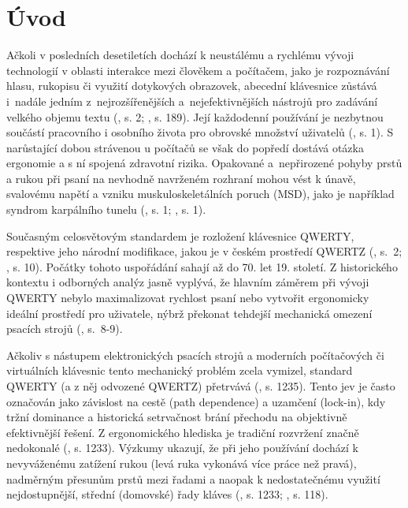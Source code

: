 \documentclass[a4paper, twoside, 12pt, czech]{article}
\begin{document}
\section{Úvod}
Ačkoli v posledních desetiletích dochází k neustálému a rychlému vývoji technologií 
v oblasti interakce mezi člověkem a počítačem, jako je rozpoznávání hlasu, rukopisu 
či využití dotykových obrazovek, abecední klávesnice zůstává i~nadále jedním 
z~nejrozšířenějších a~nejefektivnějších nástrojů pro zadávání velkého objemu textu
(\cite{applicationAlgo}, s. 2; \cite{textEntrySystems}, s. 189). 
Její každodenní používání je nezbytnou součástí pracovního i osobního života pro 
obrovské množství uživatelů (\cite{engramapproach}, s. 1). 
S narůstající dobou strávenou u počítačů se však do 
popředí dostává otázka ergonomie a s ní spojená zdravotní rizika. Opakované 
a~nepřirozené pohyby prstů a rukou při psaní na nevhodně navrženém rozhraní mohou 
vést k únavě, svalovému napětí a vzniku muskuloskeletálních poruch (MSD), jako 
je například syndrom karpálního tunelu (\cite{engramapproach}, s. 1; \cite{applicationAlgo}, s. 1).

Současným celosvětovým standardem je rozložení klávesnice QWERTY, 
respektive jeho národní modifikace, jakou je v českém prostředí QWERTZ (\cite{applicationAlgo}, s.~2; \cite{lockin}, s. 10). Počátky 
tohoto uspořádání sahají až do 70. let 19. století. Z historického kontextu i 
odborných analýz jasně vyplývá, že hlavním záměrem při vývoji QWER\-TY nebylo 
maximalizovat rychlost psaní nebo vytvořit ergonomicky ideální pros\-tředí pro 
uživatele, nýbrž překonat tehdejší mechanická omezení psacích strojů
(\cite{textEntrySystems}, s.~8-9). 

Ačkoliv s nástupem elektronických psacích strojů a moderních počítačových či virtuálních 
klávesnic tento mechanický problém zcela vymizel, standard QWER\-TY (a z něj odvozené 
QWERTZ) přetrvává (\cite{qwerty-dilemma}, s. 1235). Tento jev je často označo\-ván jako závislost na cestě (path dependence) 
a uzamčení (lock-in), kdy tržní dominance a historická setrvačnost brání přechodu 
na objektivně efektivnější řešení. Z ergonomického hlediska je tradiční rozvržení 
značně nedokonalé (\cite{qwerty-dilemma}, s. 1233). Výzkumy ukazují, že při jeho používání dochází k nevyváženému 
zatížení rukou (levá ruka vykonává více práce než pravá), nadměrným přesunům prstů 
mezi řadami a naopak k nedostatečnému využití nejdostupnější, střední (domovské) řady 
kláves (\cite{qwerty-dilemma}, s. 1233; \cite{qwerty-immortal}, s. 118).
\end{document}
